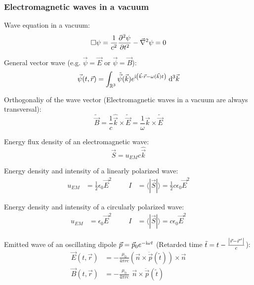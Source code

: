 		\subsubsection{Electromagnetic waves in a vacuum}
			\noindent
			Wave equation in a vacuum:
			\begin{equation}
				\Box\psi = \frac{1}{c^2} \frac{\partial^2 \psi}{\partial t^2} - \vec{\nabla}^2 \psi = 0
			\end{equation}

			\noindent
			General vector wave (e.g. $\vec{\psi}=\vec{E}$ or $ \vec{\psi}=\vec{B}$):
			\begin{equation}
				\vec{\psi}(t,\vec{r}) = \int_{\mathbb{R}^3} \tilde{\vec{\psi}} (\vec{k}) e^{\mathrm{i}\left(\vec{k}\cdot\vec{r} - \omega(\vec{k})t \right)}\; \mathrm{d}^3\vec{k}
			\end{equation}

			\noindent
			Orthogonaliy of the wave vector (Electromagnetic waves in a vacuum are always transversal):
			\begin{equation}
				\tilde{\vec{B}} = \frac{1}{c}\hat{\vec{k}}\times\tilde{\vec{E}} = \frac{1}{\omega}\vec{k}\times\tilde{\vec{E}}
			\end{equation}

			\noindent
			Energy flux density of an electromagnetic wave:
			\begin{equation}
				\vec{S} = u_{EM}c\hat{\vec{k}}
			\end{equation}

			\noindent
			Energy density and intensity of a linearly polarized wave:
			\begin{equation}
				\begin{aligned}
					u_{EM} &= \frac{1}{2}\epsilon_0\vec{E}^2 &\hspace{20pt}
					I &= \langle|\vec{S}|\rangle = \frac{1}{2}c\epsilon_0\vec{E}^2
				\end{aligned}
			\end{equation}

			\noindent
			Energy density and intensity of a circularly polarized wave:
			\begin{equation}
				\begin{aligned}
					u_{EM} &= \epsilon_0\vec{E}^2 &\hspace{20pt}
					I &= \langle|\vec{S}|\rangle = c\epsilon_0\vec{E}^2
				\end{aligned}
			\end{equation}

			\noindent
			Emitted wave of an oscillating dipole $\vec{p} = \vec{p}_0 e^{-\mathrm{i}\omega t}$ (Retarded time $\tilde{t} = t-\frac{\left|\vec{r}-\pvec{r}'\right|}{c}$):
			\begin{equation}
				\begin{aligned}
					\vec{E}(t,\vec{r}) &= -\frac{\mu_0}{4\pi r c}	\left(\vec{n}\times\ddot{\vec{p}}(\tilde{t})\right) \times \vec{n} \\
					\vec{B}(t,\vec{r}) &= -\frac{\mu_0}{4\pi r c} \phantom{\Big(}\vec{n}\times\ddot{\vec{p}}(\tilde{t}) \\
				\end{aligned}
			\end{equation}

